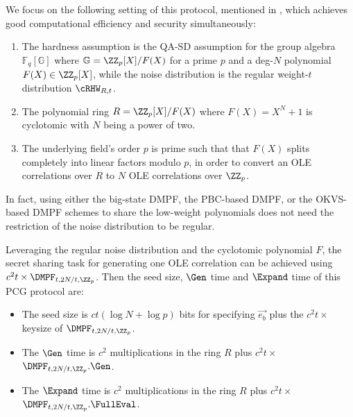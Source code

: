 We focus on the following setting of this protocol, mentioned in , which achieves good computational efficiency and security simultaneously: 
\begin{enumerate}
    \item The hardness assumption is the QA-SD assumption for the group algebra $\mathbb{F}_q\left[\mathbb{G}\right]$ where $\mathbb{G} = \ZZ_p[X]/F(X)$ for a prime $p$ and a deg-$N$ polynomial $F(X)\in\ZZ_p[X]$, while the noise distribution is the regular weight-$t$ distribution $\cRHW_{R,t}$. 
    \item The polynomial ring $R = \ZZ_p[X]/F(X)$ where $F(X) = X^N+1$ is cyclotomic with $N$ being a power of two. 
    \item The underlying field's order $p$ is prime such that that $F(X)$ splits completely into linear factors modulo $p$, in order to convert an OLE correlations over $R$ to $N$ OLE correlations over $\ZZ_p$. 
\end{enumerate}
\begin{remark}
    In fact, using either the big-state DMPF, the PBC-based DMPF, or the OKVS-based DMPF schemes to share the low-weight polynomials does not need the restriction of the noise distribution to be regular. 
\end{remark}

Leveraging the regular noise distribution and the cyclotomic polynomial $F$, the secret sharing task for generating one OLE correlation can be achieved using $c^2t\times \DMPF_{t,2N/t, \ZZ_p}$. Then the seed size, $\Gen$ time and $\Expand$ time of this PCG protocol are: 
\begin{itemize}
    \item The seed size is $ct(\log N+\log p)$ bits for specifying $\vec{e_b}$ plus the $c^2t\times $ keysize of $\DMPF_{t,2N/t, \ZZ_p}$. 
    \item The $\Gen$ time is $c^2$ multiplications in the ring $R$ plus $c^2t\times$ $\DMPF_{t,2N/t, \ZZ_p}.\Gen$. 
    \item The $\Expand$ time is $c^2$ multiplications in the ring $R$ plus $c^2t\times$ $\DMPF_{t,2N/t, \ZZ_p}.\FullEval$. 
\end{itemize}